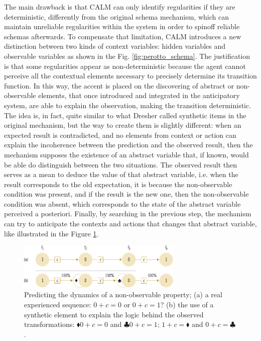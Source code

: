 \documentclass[runningheads]{llncs}
\begin{document}
The main drawback is that CALM can only identify regularities if they are deterministic, differently from the original schema mechanism, which can maintain unreliable regularities within the system in order to spinoff reliable schemas afterwards. 
To compensate that limitation, CALM introduces a new distinction between two kinds of context variables: hidden variables and observable variables as shown in the Fig. \ref{fig:perotto_schema}.
The justification is that some regularities appear as non-deterministic because the agent cannot perceive all the contextual elements necessary to precisely determine its transition function.
In this way, the accent is placed on the discovering of abstract or non-observable elements, that once introduced and integrated in the anticipatory system, are able to explain the observation, making the transition deterministic. 
The idea is, in fact, quite similar to what Dresher called synthetic items in the original mechanism, but the way to create them is slightly different: 
when an expected result is contradicted, and no elements from context or action can explain the incoherence between the prediction and the observed result, then the mechanism supposes the existence of an abstract variable that, if known, would be able do distinguish between the two situations.
The observed result then serves as a mean to deduce the value of that abstract variable, i.e. when the result corresponds to the old expectation, it is because the non-observable condition was present, and if the result is the new one, then the non-observable condition was absent, which corresponds to the state of the abstract variable perceived a posteriori.
Finally, by searching in the previous step, the mechanism can try to anticipate the contexts and actions that changes that abstract variable, like illustrated in the Figure \ref{fig:perotto_abstraction}.

\begin{figure}
	\centering
	\includegraphics[width=0.7\textwidth]{Figure_5_CALM_dynamics.pdf}
	\caption{Predicting the dynamics of a non-observable property; (a) a real experienced sequence: $0 + c = 0$ or $0 + c = 1$? (b) the use of a synthetic element to explain the logic behind the observed transformations: $\blacklozenge 0 + c = 0$ and $\clubsuit 0 + c = 1$; $1 + c = \blacklozenge$ and $0 + c = \clubsuit$.} 
	\label{fig:perotto_abstraction}
\end{figure}
\end{document}
